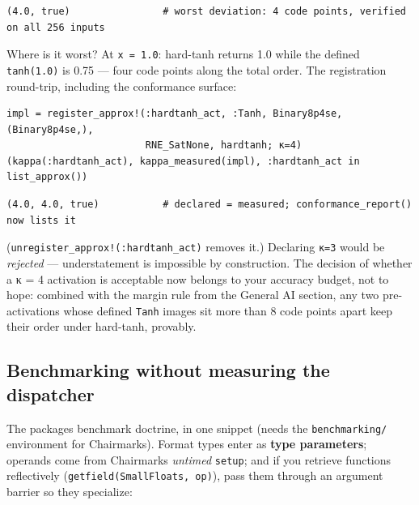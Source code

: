 \begin{verbatim}
(4.0, true)                # worst deviation: 4 code points, verified on all 256 inputs
\end{verbatim}



Where is it worst? At \texttt{x = 1.0}: hard-tanh returns 1.0 while the defined \texttt{tanh(1.0)} is 0.75 — four code points along the total order. The registration round-trip, including the conformance surface:




\begin{verbatim}
impl = register_approx!(:hardtanh_act, :Tanh, Binary8p4se, (Binary8p4se,),
                        RNE_SatNone, hardtanh; κ=4)
(kappa(:hardtanh_act), kappa_measured(impl), :hardtanh_act in list_approx())
\end{verbatim}




\begin{verbatim}
(4.0, 4.0, true)           # declared = measured; conformance_report() now lists it
\end{verbatim}



(\texttt{unregister\_approx!(:hardtanh\_act)} removes it.) Declaring \texttt{κ=3} would be \emph{rejected} — understatement is impossible by construction. The decision of whether a κ = 4 activation is acceptable now belongs to your accuracy budget, not to hope: combined with the margin rule from the General AI section, any two pre-activations whose defined \texttt{Tanh} images sit more than 8 code points apart keep their order under hard-tanh, provably.



\subsection{Benchmarking without measuring the dispatcher}



\label{585007679975857547}{}


The package{\textquotesingle}s benchmark doctrine, in one snippet (needs the \texttt{benchmarking/} environment for Chairmarks). Format types enter as \textbf{type parameters}; operands come from Chairmarks{\textquotesingle} \emph{untimed} \texttt{setup}; and if you retrieve functions reflectively (\texttt{getfield(SmallFloats, op)}), pass them through an argument barrier so they specialize:




